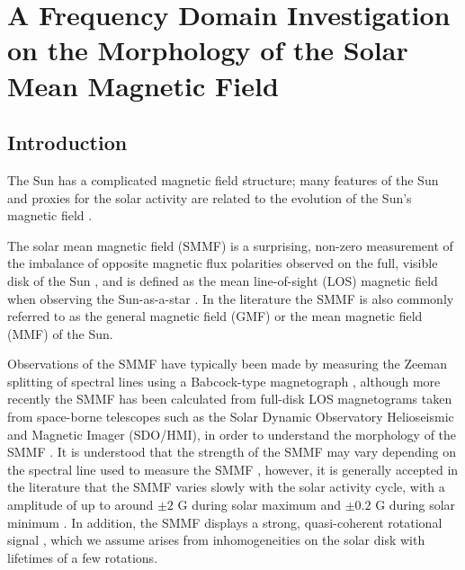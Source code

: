 \chapter{A Frequency Domain Investigation on the Morphology of the Solar Mean Magnetic Field}\label{chap:SMMF}

\section{Introduction}\label{sec:SMMF_intro}

The Sun has a complicated magnetic field structure; many features of the Sun and proxies for the solar activity are related to the evolution of the Sun's magnetic field \citep{wu_solar_2018}.

The solar mean magnetic field (SMMF) is a surprising, non-zero measurement of the imbalance of opposite magnetic flux polarities observed on the full, visible disk of the Sun \citep{svalgaard_suns_1975}, and is defined as the mean line-of-sight (LOS) magnetic field when observing the Sun-as-a-star \citep{scherrer_mean_1977, scherrer_mean_1977-1, garcia_integrated_1999}. In the literature the SMMF is also commonly referred to as the general magnetic field (GMF) \citep{severny_time_1971} or the mean magnetic field (MMF) \citep{kotov_mean_2008} of the Sun.

Observations of the SMMF have typically been made by measuring the Zeeman splitting of spectral lines using a Babcock-type magnetograph \citep{scherrer_mean_1977}, although more recently the SMMF has been calculated from full-disk LOS magnetograms taken from space-borne telescopes such as the Solar Dynamic Observatory Helioseismic and Magnetic Imager (SDO/HMI), in order to understand the morphology of the SMMF \citep{kutsenko_contribution_2017, bose_variability_2018}. It is understood that the strength of the SMMF may vary depending on the spectral line used to measure the SMMF \citep{kotov_mean_2008, kotov_enigmas_2012}, however, it is generally accepted in the literature that the SMMF varies slowly with the solar activity cycle, with a amplitude of up to around $\pm 2$ G during solar maximum and $\pm 0.2$ G during solar minimum \citep{plachinda_general_2011}. In addition, the SMMF displays a strong, quasi-coherent rotational signal \citep{chaplin_studies_2003, xie_temporal_2017}, which we assume arises from inhomogeneities on the solar disk with lifetimes of a few rotations.

